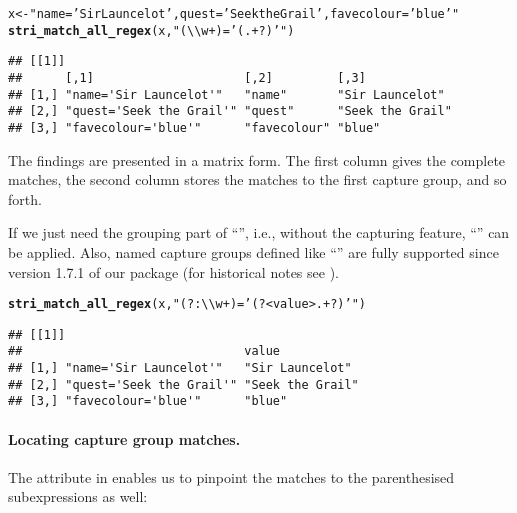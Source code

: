 \documentclass[nojss]{jss}\usepackage[]{graphicx}\usepackage[]{xcolor}
\makeatletter
\newcommand{\hlstr}[1]{\textcolor[rgb]{0.192,0.494,0.8}{#1}}%
\newcommand{\hlstd}[1]{\textcolor[rgb]{0.345,0.345,0.345}{#1}}%
\newcommand{\hlkwb}[1]{\textcolor[rgb]{0.69,0.353,0.396}{#1}}%
\newcommand{\hlkwd}[1]{\textcolor[rgb]{0.737,0.353,0.396}{\textbf{#1}}}%
\newenvironment{kframe}{%
 \def\at@end@of@kframe{}%
 \ifinner\ifhmode%
  \def\at@end@of@kframe{\end{minipage}}%
  \begin{minipage}{\columnwidth}%
 \fi\fi%
 \def\FrameCommand##1{\hskip\@totalleftmargin \hskip-\fboxsep
 \colorbox{shadecolor}{##1}\hskip-\fboxsep
     \hskip-\linewidth \hskip-\@totalleftmargin \hskip\columnwidth}%
 \MakeFramed {\advance\hsize-\width
   \@totalleftmargin\z@ \linewidth\hsize
   \@setminipage}}%
 {\par\unskip\endMakeFramed%
 \at@end@of@kframe}
\newenvironment{knitrout}{}{} %
\makeatother
\begin{document}
\begin{knitrout}
\color{fgcolor}\begin{kframe}
\begin{alltt}
\hlstd{x} \hlkwb{<-} \hlstr{"name='Sir Launcelot', quest='Seek the Grail', favecolour='blue'"}
\hlkwd{stri_match_all_regex}\hlstd{(x,} \hlstr{"(\textbackslash{}\textbackslash{}w+)='(.+?)'"}\hlstd{)}
\end{alltt}
\begin{verbatim}
## [[1]]
##      [,1]                     [,2]         [,3]            
## [1,] "name='Sir Launcelot'"   "name"       "Sir Launcelot" 
## [2,] "quest='Seek the Grail'" "quest"      "Seek the Grail"
## [3,] "favecolour='blue'"      "favecolour" "blue"
\end{verbatim}
\end{kframe}
\end{knitrout}

The findings are presented in a matrix form. The first column
gives the complete matches, the second column stores the matches to the
first capture group, and so forth.


If we just need the grouping part of ``'', i.e.,
without the capturing feature,
``'' can be applied.
Also, named capture groups defined like
``'' are fully supported
since version 1.7.1 of our package (for historical notes see
\citealp{namedCapture}).

\begin{knitrout}
\color{fgcolor}\begin{kframe}
\begin{alltt}
\hlkwd{stri_match_all_regex}\hlstd{(x,} \hlstr{"(?:\textbackslash{}\textbackslash{}w+)='(?<value>.+?)'"}\hlstd{)}
\end{alltt}
\begin{verbatim}
## [[1]]
##                               value           
## [1,] "name='Sir Launcelot'"   "Sir Launcelot" 
## [2,] "quest='Seek the Grail'" "Seek the Grail"
## [3,] "favecolour='blue'"      "blue"
\end{verbatim}
\end{kframe}
\end{knitrout}



\paragraph{Locating capture group matches.}
The  attribute in 
enables us to pinpoint the matches to the parenthesised subexpressions
as well:
\end{document}
